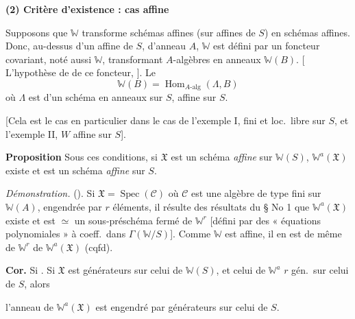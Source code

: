\documentclass[11pt,a4paper]{article}
\begin{document}
\textbf{(2) Critère d'existence : cas affine}

Supposons que $\mathbb{W}$ transforme schémas affines (sur  affines
de $S$) en schémas affines. Donc, au-dessus d'un  affine
de $S$, d'anneau $A$, $\mathbb{W}$ est défini par un foncteur
covariant, noté aussi $\mathbb{W}$, transformant
 $A$-algèbres en anneaux $\mathbb{W}(B)$. [
L'hypothèse de  
de ce foncteur, \ill{} \ill{}  \ill{}]. Le
\ill{} \ill{} \ill{} \ill{}
\[
  \mathbb{W}(B) = \operatorname{Hom}_{A\text{-}\mathrm{alg}}(\Lambda, B)
\]
où $\Lambda$ est   d'un schéma en
anneaux  sur $S$, affine sur $S$.


[Cela est le cas en particulier dans le cas de l'exemple I,
  fini et loc.\ libre sur $S$, et
l'exemple II,  $W$  affine sur $S$].

\textbf{Proposition} Sous ces conditions, si \struck{\ill{}}
$\mathfrak{X}$ est un schéma \emph{affine} sur $\mathbb{W}(S)$,
$\mathbb{W}^{a}(\mathfrak{X})$ existe et est un schéma \emph{affine} sur
$S$.

\textit{Démonstration.}  (). Si $\mathfrak{X} =
\operatorname{Spec}(\mathcal{C})$ où $\mathcal{C}$ est une algèbre de type
fini sur $\mathbb{W}(A)$, engendrée par $r$ éléments,
il résulte des résultats du § No 1
que $\mathbb{W}^{a}(\mathfrak{X})$ existe et est $\simeq$ un
sous-préschéma fermé de $\mathbb{W}^{r}$ [défini
par des « équations polynomiales » à coeff.\ dans
$\Gamma(\mathbb{W}/S)$]. Comme  $\mathbb{W}$ est
affine, il en est de même de  $\mathbb{W}^{r}$
\ill{} \ill{} de $\mathbb{W}^{a}(\mathfrak{X})$ (cqfd). \ill{}
\ill{} \ill{} \ill{}

\textbf{Cor.} Si \struck{\ill{} \ill{}} . Si
$\mathfrak{X}$ est \ill{} \ill{} \ill{} générateurs
sur celui de $\mathbb{W}(S)$, et celui de $\mathbb{W}^{a}$ 
$r$ gén.\ sur celui de $S$, alors

l'anneau de $\mathbb{W}^{a}(\mathfrak{X})$ est engendré par
 générateurs sur celui de $S$.
\end{document}
